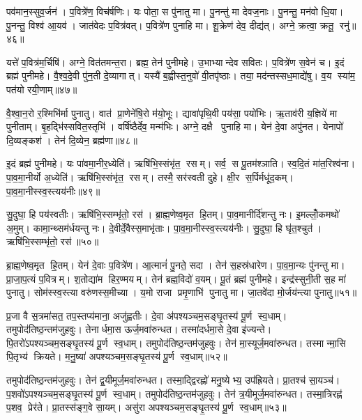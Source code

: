 पव॑मान॒स्सुव॒र्जन॑। प॒वित्रे॑ण॒ विच॑र्\mbox{}षणिः। यः पोता॒ स पु॑नातु मा। पु॒नन्तु॑ मा देवज॒नाः। पु॒नन्तु॒ मन॑वो धि॒या। पु॒नन्तु॒ विश्व॑ आ॒यव॑। जात॑वेदः प॒वित्र॑वत्। प॒वित्रे॑ण पुनाहि मा। शू॒क्रेण॑ देव॒ दीद्य॑त्। अग्ने॒ क्रत्वा॒ क्रतू॒ रनु॑॥४६॥

यत्ते॑ प॒वित्र॑म॒र्चिषि॑। अग्ने॒ वित॑तमन्त॒रा। ब्रह्म॒ तेन॑ पुनीमहे। उ॒भाभ्यान्देव सवितः। प॒वित्रे॑ण स॒वेन॑ च। इ॒दं ब्रह्म॑ पुनीमहे। वै॒श्व॒दे॒वी पु॑न॒ती दे॒व्यागात्। यस्यै॑ ब॒ह्वीस्त॒नुवो॑ वी॒तपृ॑ष्ठाः। तया॒ मद॑न्तस्सध॒माद्ये॑षु। व॒य स्या॑म॒ पत॑यो रयी॒णाम्॥४७॥

वै॒श्वा॒न॒रो र॒श्मिभि॑र्मा पुनातु। वात॑ प्रा॒णेने॑षि॒रो म॑यो॒भूः। द्यावा॑पृथि॒वी पय॑सा॒ पयो॑भिः। ऋ॒ताव॑री य॒ज्ञिये॑ मा पुनीताम्। बृ॒हद्भि॑स्सवित॒स्तृभि॑। वर्\mbox{}षि॑ष्ठैर्देव॒ मन्म॑भिः। अग्ने॒ दक्षै पुनाहि मा। येन॑ दे॒वा अपु॑नत। येनापो॑ दि॒व्यङ्कश॑। तेन॑ दि॒व्येन॒ ब्रह्म॑णा॥४८॥

इ॒दं ब्रह्म॑ पुनीमहे। यः पा॑वमा॒नीर॒ध्येति॑। ऋषि॑भि॒स्संभृ॑त॒ रसम्। सर्व॒ स पू॒तम॑श्ञाति। स्व॒दि॒तं मा॑त॒रिश्व॑ना। पा॒व॒मा॒नीर्यो अ॒ध्येति॑। ऋषि॑भि॒स्संभृ॑त॒ रसम्। तस्मै॒ सर॑स्वती दुहे। क्षी॒र स॒र्पिर्मधू॑द॒कम्। पा॒व॒मा॒नीस्स्व॒स्त्यय॑नीः॥४९॥

सु॒दुघा॒ हि पय॑स्वतीः। ऋषि॑भि॒स्सम्भृ॑तो॒ रस॑। ब्रा॒ह्म॒णेष्व॒मृत हि॒तम्। पा॒व॒मानीर्दि॑शन्तु नः। इ॒मल्लोँ॒कमथो॑ अ॒मुम्। कामा॒न्थ्सम॑र्धयन्तु नः। दे॒वीर्दे॒वैस्स॒माभृ॑ताः। पा॒व॒मा॒नीस्स्व॒स्त्यय॑नीः। सु॒दुघा॒ हि घृ॑त॒श्चुत॑। ऋषि॑भि॒स्सम्भृ॑तो॒ रस॑॥५०॥

ब्रा॒ह्म॒णेष्व॒मृत हि॒तम्। येन॑ दे॒वाः प॒वित्रे॑ण। आ॒त्मानं॑ पु॒नते॒ सदा। तेन॑ स॒हस्र॑धारेण। पा॒व॒मा॒न्यः पु॑नन्तु मा। प्रा॒जा॒प॒त्यं प॒वित्रम्। श॒तोद्या॑म हिर॒ण्मयम्। तेन॑ ब्रह्म॒विदो॑ व॒यम्। पू॒तं ब्रह्म॑ पुनीमहे। इन्द्र॑स्सुनी॒ती स॒ह मा॑ पुनातु। सोम॑स्स्व॒स्त्या वरु॑णस्स॒मीच्या। य॒मो राजा प्रमृ॒णाभि॑ पुनातु मा। जा॒तवे॑दा मो॒र्जय॑न्त्या पुनातु॥५१॥\anuvakamend[अनु॑ रयी॒णां ब्रह्म॑णा स्व॒स्त्यय॑नीस्सु॒दुघा॒ हि घृ॑त॒श्चुत॒ ऋषि॑भि॒स्सम्भृ॑तो॒ रस॑ पुनातु॒ त्रीणि॑ च]

प्र॒जा वै स॒त्रमा॑सत॒ तप॒स्तप्य॑माना॒ अजु॑ह्वतीः। दे॒वा अ॑पश्यञ्चम॒सङ्घृ॒तस्य॑ पू॒र्ण स्व॒धाम्। तमुपोद॑तिष्ठ॒न्तम॑जुहवुः। तेनार्धमा॒स ऊर्ज॒मवा॑रुन्धत। तस्मा॑दर्धमा॒से दे॒वा इ॑ज्यन्ते। पि॒तरो॑ऽपश्यञ्चम॒सङ्घृ॒तस्य॑ पू॒र्ण स्व॒धाम्। तमुपोद॑तिष्ठ॒न्तम॑जुहवुः। तेन॑ मा॒स्यूर्ज॒मवा॑रुन्धत। तस्मान्मा॒सि पि॒तृभ्य॑ क्रियते। म॒नु॒ष्या॑ अपश्यञ्चम॒सङ्घृ॒तस्य॑ पू॒र्ण स्व॒धाम्॥५२॥

तमुपोद॑तिष्ठ॒न्तम॑जुहवुः। तेन॑ द्व॒यीमूर्ज॒मवा॑रुन्धत। तस्मा॒द्द्विरह्नो॑ मनु॒ष्येभ्य॒ उप॑ह्रियते। प्रा॒तश्च॑ सा॒यञ्च॑। प॒शवो॑ऽपश्यञ्चम॒सङ्घृ॒तस्य॑ पू॒र्ण स्व॒धाम्। तमुपोद॑तिष्ठ॒न्तम॑जुहवुः। तेन॑ त्र॒यीमूर्ज॒मवा॑रुन्धत। तस्मा॒त्रिरह्न॑ प॒शव॒ प्रेर॑ते। प्रा॒तस्स॑ङ्ग॒वे सा॒यम्। असु॑रा अपश्यञ्चम॒सङ्घृ॒तस्य॑ पू॒र्ण स्व॒धाम्॥५३॥

